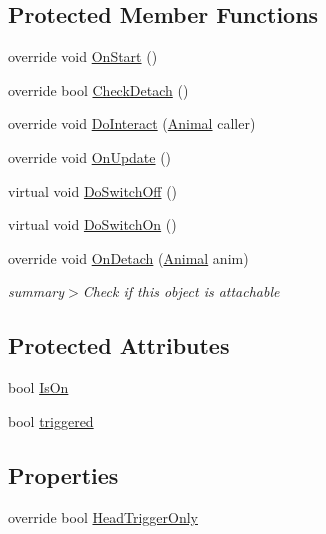 \subsection*{Protected Member Functions}
\begin{DoxyCompactItemize}
\item 
override void \mbox{\hyperlink{class_lever_af2c615a25c4a7296e38f5120173347c9}{On\+Start}} ()
\item 
override bool \mbox{\hyperlink{class_lever_a564e83f71f387279a5e6ef4c1617e990}{Check\+Detach}} ()
\item 
override void \mbox{\hyperlink{class_lever_a0a1c141e11547a71e93492bebbd045d7}{Do\+Interact}} (\mbox{\hyperlink{class_animal}{Animal}} caller)
\item 
override void \mbox{\hyperlink{class_lever_a951c61f78d4f24b33d4ceb7ac3d53efb}{On\+Update}} ()
\item 
virtual void \mbox{\hyperlink{class_lever_af15223c9c4a5fd08045bd4a7aca73351}{Do\+Switch\+Off}} ()
\item 
virtual void \mbox{\hyperlink{class_lever_a9941602be9b41c21f29d18050941aa68}{Do\+Switch\+On}} ()
\item 
override void \mbox{\hyperlink{class_lever_abe5f0492971af0f479a638b39ed6e9d9}{On\+Detach}} (\mbox{\hyperlink{class_animal}{Animal}} anim)
\begin{DoxyCompactList}\small\item\em summary$>$Check if this object is attachable\end{DoxyCompactList}\end{DoxyCompactItemize}
\subsection*{Protected Attributes}
\begin{DoxyCompactItemize}
\item 
bool \mbox{\hyperlink{class_lever_ae7619f913adb314011fac83c4f218db5}{Is\+On}}
\item 
bool \mbox{\hyperlink{class_lever_ae8882d10f3ab2572d162a6338e2ec36d}{triggered}}
\end{DoxyCompactItemize}
\subsection*{Properties}
\begin{DoxyCompactItemize}
\item 
override bool \mbox{\hyperlink{class_lever_afe56ba98c4cdf20260b7152caab3f3d9}{Head\+Trigger\+Only}}
\end{DoxyCompactItemize}
